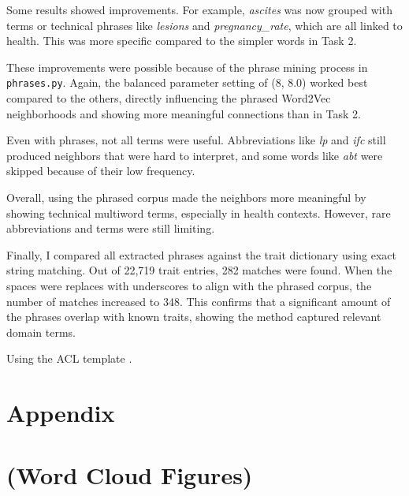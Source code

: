 \documentclass[11pt]{article}
\begin{document}
Some results showed improvements. For example, \textit{ascites} was now grouped with terms or technical 
phrases like \textit{lesions} and \textit{pregnancy\_rate}, which are all linked to health. 
This was more specific compared to the simpler words in Task 2.  

These improvements were possible because of the phrase mining process in \texttt{phrases.py}. Again, the 
balanced parameter setting of (8, 8.0) worked best compared to the others, directly influencing the phrased 
Word2Vec neighborhoods and showing more meaningful connections than in Task 2.  

Even with phrases, not all terms were useful. Abbreviations like \textit{lp} and \textit{ifc} still 
produced neighbors that were hard to interpret, and some words like \textit{abt} were skipped because 
of their low frequency.  

Overall, using the phrased corpus made the neighbors more meaningful by showing technical multiword terms, 
especially in health contexts. However, rare abbreviations and terms were still limiting.  

Finally, I compared all extracted phrases against the trait dictionary using exact string matching. 
Out of 22,719 trait entries, 282 matches were found. When the spaces were replaces with underscores 
to align with the phrased corpus, the number of matches increased to 348. This confirms that a significant 
amount of the phrases overlap with known traits, showing the method captured relevant domain terms.

\vspace*{1em}

Using the ACL template \citep{aclstylefiles}.

\vspace*{1em}



\vspace*{1em}

\appendix
\section*{Appendix}

\section{ (Word Cloud Figures)}
\end{document}
